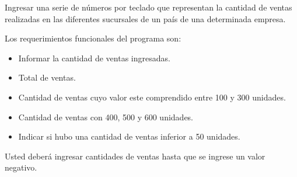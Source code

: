 Ingresar una serie de números por teclado que representan la cantidad de ventas realizadas en las diferentes sucursales de un país de una determinada empresa.

Los requerimientos funcionales del programa son:

\begin{itemize}
	\item Informar la cantidad de ventas ingresadas.
	\item Total de ventas.
	\item Cantidad de ventas cuyo valor este comprendido entre 100 y 300 unidades.
	\item Cantidad de ventas con 400, 500 y 600 unidades.
	\item Indicar si hubo una cantidad de ventas inferior a 50 unidades.
\end{itemize}

Usted deberá ingresar cantidades de ventas hasta que se ingrese un valor negativo.